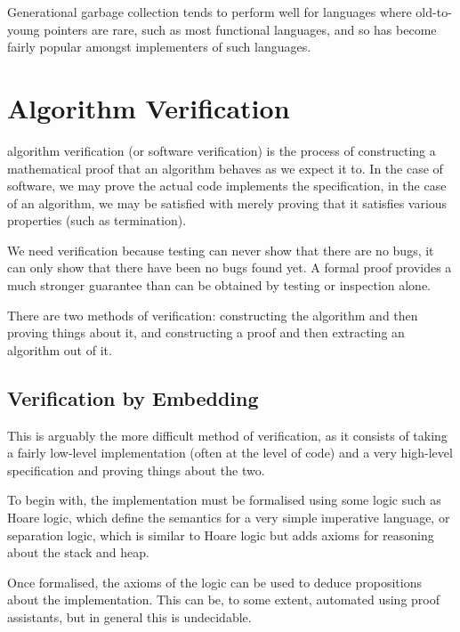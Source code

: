 Generational garbage collection tends to perform well for languages
where old-to-young pointers are rare, such as most
functional languages, and so has become fairly popular amongst
implementers of such languages.

\section{Algorithm Verification}
\label{sec:lit-verification}


\Gls{algorithm verification} (or software verification) is the process
of constructing a mathematical proof that an algorithm behaves as we
expect it to. In the case of software, we may prove the actual code
implements the specification, in the case of an algorithm, we may be
satisfied with merely proving that it satisfies various properties
(such as termination).

We need verification because testing can never show that there are no
bugs, it can only show that there have been no bugs found yet. A
formal proof provides a much stronger guarantee than can be obtained
by testing or inspection alone.

There are two methods of verification: constructing the algorithm and
then proving things about it, and constructing a proof and then
extracting an algorithm out of it.

\subsection{Verification by Embedding}
\label{sec:lit-verification-embedding}

This is arguably the more difficult method of verification, as it
consists of taking a fairly low-level implementation (often at the
level of code) and a very high-level specification and proving things
about the two.

To begin with, the implementation must be formalised using some logic
such as Hoare logic\cite{Hoare69}, which define the semantics for a
very simple imperative language, or separation logic\cite{Reynolds02},
which is similar to Hoare logic but adds axioms for reasoning about
the stack and heap.

Once formalised, the axioms of the logic can be used to deduce
propositions about the implementation. This can be, to some extent,
automated using \glspl{proof assistant}, but in general this is
undecidable.

